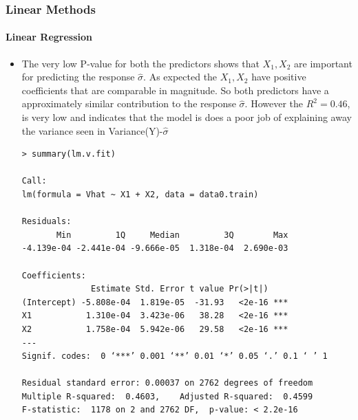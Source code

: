 \documentclass[twoside,12pt]{article}
\begin{document}
\FloatBarrier
\subsubsection{Linear Methods}

\paragraph{Linear Regression}
\begin{itemize}
\FloatBarrier
\item
The very low P-value for both the predictors shows that $X_1,X_2$ are important for predicting the response $\hat{\sigma}$. As expected the $X_1,X_2$ have positive coefficients that are comparable in magnitude. So both predictors have a approximately similar contribution to the response $\hat{\sigma}$. However the $R^2=0.46$, is very low and indicates that the model is does a poor job of explaining away the variance seen in Variance(Y)-$\hat{\sigma}$
\begin{verbatim}
> summary(lm.v.fit)

Call:
lm(formula = Vhat ~ X1 + X2, data = data0.train)

Residuals:
       Min         1Q     Median         3Q        Max 
-4.139e-04 -2.441e-04 -9.666e-05  1.318e-04  2.690e-03 

Coefficients:
              Estimate Std. Error t value Pr(>|t|)    
(Intercept) -5.808e-04  1.819e-05  -31.93   <2e-16 ***
X1           1.310e-04  3.423e-06   38.28   <2e-16 ***
X2           1.758e-04  5.942e-06   29.58   <2e-16 ***
---
Signif. codes:  0 ‘***’ 0.001 ‘**’ 0.01 ‘*’ 0.05 ‘.’ 0.1 ‘ ’ 1

Residual standard error: 0.00037 on 2762 degrees of freedom
Multiple R-squared:  0.4603,    Adjusted R-squared:  0.4599 
F-statistic:  1178 on 2 and 2762 DF,  p-value: < 2.2e-16


\end{verbatim}


\end{itemize}
\end{document}
